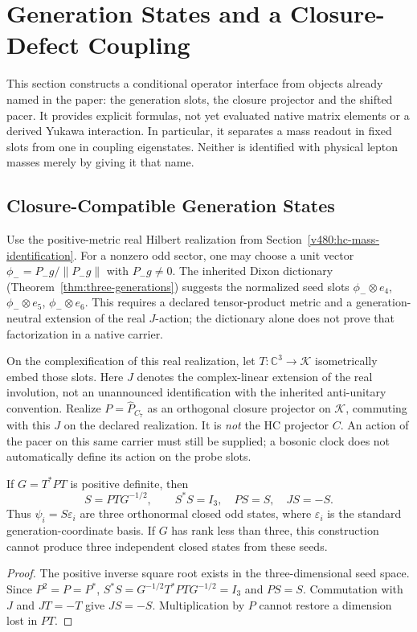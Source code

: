 \section{Generation States and a Closure-Defect Coupling}
\label{v480:generation-coupling}

This section constructs a conditional operator interface from objects
already named in the paper: the generation slots, the closure projector
and the shifted pacer. It provides explicit formulas, not yet evaluated
native matrix elements or a derived Yukawa interaction. In particular,
it separates a mass readout in fixed slots from one in coupling
eigenstates. Neither is identified with physical lepton masses merely
by giving it that name.

\subsection{Closure-Compatible Generation States}
\label{v480:generation-states}

Use the positive-metric real Hilbert realization from
Section~\ref{v480:hc-mass-identification}. For a nonzero odd sector,
one may choose a unit vector $\phi_-=P_-g/\|P_-g\|$ with
$P_-g\ne0$. The inherited Dixon dictionary
(Theorem~\ref{thm:three-generations}) suggests the normalized seed
slots $\phi_-\otimes e_4$, $\phi_-\otimes e_5$,
$\phi_-\otimes e_6$. This requires a declared tensor-product metric
and a generation-neutral extension of the real $J$-action; the
dictionary alone does not prove that factorization in a native carrier.

On the complexification of this real realization, let
$T:\mathbb C^3\to\mathcal K$ isometrically embed those slots.
Here $J$ denotes the complex-linear extension of the real involution,
not an unannounced identification with the inherited anti-unitary
convention. Realize $P=\hat P_{C_7}$ as an orthogonal closure
projector on $\mathcal K$, commuting with this $J$ on the declared
realization. It is \emph{not} the HC projector $C$. An action of the
pacer on this same carrier must still be supplied; a bosonic clock
does not automatically define its action on the probe slots.

\begin{proposition}
\label{v480:generation-closed-seeds}
If $G=T^*PT$ is positive definite, then
\[
 S=PTG^{-1/2},\qquad S^*S=I_3,\quad PS=S,\quad JS=-S.
\]
Thus $\psi_i=S\varepsilon_i$ are three orthonormal closed odd states,
where $\varepsilon_i$ is the standard generation-coordinate basis.
If $G$ has rank less than three, this construction cannot produce
three independent closed states from these seeds.
\end{proposition}
\begin{proof}
The positive inverse square root exists in the three-dimensional
seed space. Since $P^2=P=P^*$,
$S^*S=G^{-1/2}T^*PTG^{-1/2}=I_3$ and $PS=S$.
Commutation with $J$ and $JT=-T$ give $JS=-S$.
Multiplication by $P$ cannot restore a dimension lost in $PT$.
\end{proof}


